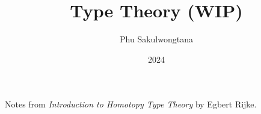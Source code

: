 \documentclass{article}
\title{Type Theory (WIP)}
\date{2024}
\author{Phu Sakulwongtana}
\begin{document}
\maketitle

Notes from \textit{Introduction to Homotopy Type Theory
} by Egbert Rijke.

% 




\end{document}
